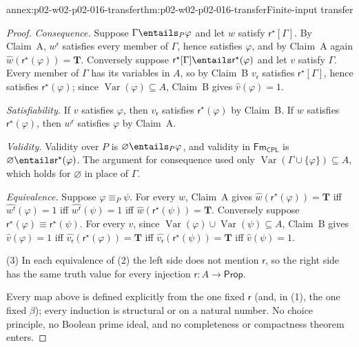 \begin{annexitem}{annex:p02-w02-p02-016-transfer}{thm:p02-w02-p02-016-transfer}{Finite-input transfer}
\begin{proof}
\emph{Consequence.}  Suppose \(\Gamma\entails_P\varphi\) and let \(w\)
satisfy \(\mathsf r^{\star}[\Gamma]\).  By Claim~A, \(w^{\mathsf r}\) satisfies every
member of \(\Gamma\), hence satisfies \(\varphi\), and by Claim~A again
\(\widehat w(\mathsf r^{\star}(\varphi))=\mathbf T\).  Conversely suppose
\(\mathsf r^{\star}[\Gamma]\entails\mathsf r^{\star}(\varphi)\) and let \(v\) satisfy
\(\Gamma\).  Every member of \(\Gamma\) has its variables in \(A\), so by
Claim~B \(v_{\mathsf r}\) satisfies \(\mathsf r^{\star}[\Gamma]\), hence satisfies
\(\mathsf r^{\star}(\varphi)\); since \(\operatorname{Var}(\varphi)\subseteq A\),
Claim~B gives \(\widehat v(\varphi)=1\).

\emph{Satisfiability.}  If \(v\) satisfies \(\varphi\), then \(v_{\mathsf r}\)
satisfies \(\mathsf r^{\star}(\varphi)\) by Claim~B.  If \(w\) satisfies
\(\mathsf r^{\star}(\varphi)\), then \(w^{\mathsf r}\) satisfies \(\varphi\) by
Claim~A.

\emph{Validity.}  Validity over \(P\) is \(\varnothing\entails_P\varphi\), and
validity in \(\mathsf{Fm}_{\mathsf{CPL}}\) is
\(\varnothing\entails\mathsf r^{\star}(\varphi)\).  The argument for consequence
used only \(\operatorname{Var}(\Gamma\cup\{\varphi\})\subseteq A\), which holds
for \(\varnothing\) in place of \(\Gamma\).

\emph{Equivalence.}  Suppose \(\varphi\equiv_P\psi\).  For every \(w\),
Claim~A gives \(\widehat w(\mathsf r^{\star}(\varphi))=\mathbf T\) iff
\(\widehat{w^{\mathsf r}}(\varphi)=1\) iff \(\widehat{w^{\mathsf r}}(\psi)=1\) iff
\(\widehat w(\mathsf r^{\star}(\psi))=\mathbf T\).  Conversely suppose
\(\mathsf r^{\star}(\varphi)\equiv\mathsf r^{\star}(\psi)\).  For every \(v\), since
\(\operatorname{Var}(\varphi)\cup\operatorname{Var}(\psi)\subseteq A\),
Claim~B gives \(\widehat v(\varphi)=1\) iff
\(\widehat{v_{\mathsf r}}(\mathsf r^{\star}(\varphi))=\mathbf T\) iff
\(\widehat{v_{\mathsf r}}(\mathsf r^{\star}(\psi))=\mathbf T\) iff
\(\widehat v(\psi)=1\).

(3) In each equivalence of (2) the left side does not mention \(\mathsf r\), so
the right side has the same truth value for every injection
\(\mathsf r:A\to\mathsf{Prop}\).

Every map above is defined explicitly from the one fixed \(\mathsf r\) (and, in
(1), the one fixed \(\beta\)); every induction is structural or on a natural
number.  No choice principle, no Boolean prime ideal, and no completeness or
compactness theorem enters.
\end{proof}
\end{annexitem}

